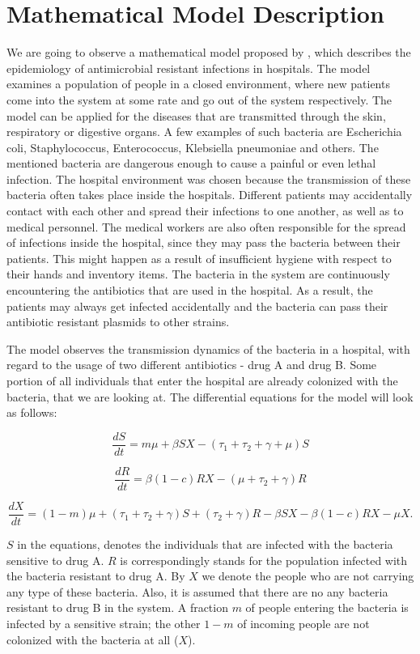 \chapter*{Mathematical Model Description}


We are going to observe a mathematical model proposed by \cite{lips}, which describes the epidemiology of antimicrobial resistant infections in hospitals. The model examines a population of people in a closed environment, where new patients come into the system at some rate and go out of the system respectively. The model can be applied for the diseases that are transmitted through the skin, respiratory or digestive organs. A few examples of such bacteria are Escherichia coli, Staphylococcus, Enterococcus, Klebsiella pneumoniae and others. The mentioned bacteria are dangerous enough to cause a painful or even lethal infection. The hospital environment was chosen because the transmission of these bacteria often takes place inside the hospitals. Different patients may accidentally contact with each other and spread their infections to one another, as well as to medical personnel. The medical workers are also often responsible for the spread of infections inside the hospital, since they may pass the bacteria between their patients. This might happen as a result of insufficient hygiene with respect to their hands and inventory items. The bacteria in the system are continuously encountering the antibiotics that are used in the hospital. As a result, the patients may always get infected accidentally and the bacteria can pass their antibiotic resistant plasmids to other strains.

The model observes the transmission dynamics of the bacteria in a hospital, with regard to the usage of two different antibiotics - drug A and drug B. Some portion of all individuals that enter the hospital are already colonized with the bacteria, that we are looking at. The differential equations for the model will look as follows:

\begin{equation}
\frac{dS}{dt} = m \mu + \beta S X - (\tau_1 + \tau_2 + \gamma + \mu) S
\end{equation}

\begin{equation}
\frac{dR}{dt} = \beta (1 - c) R X - (\mu + \tau_2 + \gamma) R
\end{equation}

\begin{equation}
\frac{dX}{dt} = (1 - m) \mu + (\tau_1 + \tau_2 + \gamma) S + (\tau_2 + \gamma) R - \beta S X - \beta (1-c) R X - \mu X.
\end{equation}

$S$ in the equations, denotes the individuals that are infected with the bacteria sensitive to drug A. $R$ is correspondingly stands for the population infected with the bacteria resistant to drug A. By $X$ we denote the people who are not carrying any type of these bacteria. Also, it is assumed that there are no any bacteria resistant to drug B in the system. A fraction $m$ of people entering the bacteria is infected by a sensitive strain; the other $1-m$ of incoming people are not colonized with the bacteria at all ($X$).